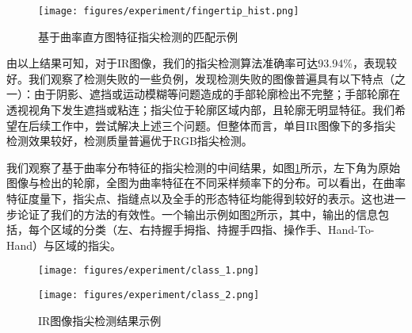 \begin{figure}[h]
  \centering
  \texttt{[image: figures/experiment/fingertip\_hist.png]}
  \caption{基于曲率直方图特征指尖检测的匹配示例}
  \label{fig:fingertip_hist}
\end{figure}

由以上结果可知，对于IR图像，我们的指尖检测算法准确率可达93.94\%，表现较好。我们观察了检测失败的一些负例，发现检测失败的图像普遍具有以下特点（之一）：由于阴影、遮挡或运动模糊等问题造成的手部轮廓检出不完整；手部轮廓在透视视角下发生遮挡或粘连；指尖位于轮廓区域内部，且轮廓无明显特征。我们希望在后续工作中，尝试解决上述三个问题。但整体而言，单目IR图像下的多指尖检测效果较好，检测质量普遍优于RGB指尖检测。

我们观察了基于曲率分布特征的指尖检测的中间结果，如图\ref{fig:fingertip_hist}所示，左下角为原始图像与检出的轮廓，全图为曲率特征在不同采样频率下的分布。可以看出，在曲率特征度量下，指尖点、指缝点以及全手的形态特征均能得到较好的表示。这也进一步论证了我们的方法的有效性。一个输出示例如图\ref{fig:ir_example}所示，其中，输出的信息包括，每个区域的分类（左、右持握手拇指、持握手四指、操作手、Hand-To-Hand）与区域的指尖。

\begin{figure}
\begin{minipage}[t]{0.5\linewidth}
\centering
\texttt{[image: figures/experiment/class\_1.png]}
\end{minipage}%
\begin{minipage}[t]{0.5\linewidth}
\centering
\texttt{[image: figures/experiment/class\_2.png]}

\end{minipage}
\caption{IR图像指尖检测结果示例}
\label{fig:ir_example}
\end{figure}

